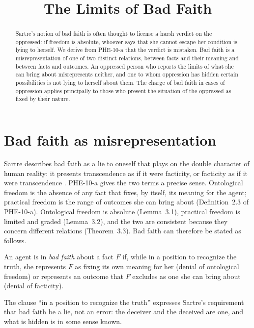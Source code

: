 \documentclass{situationist-preprint}
\title{The Limits of Bad Faith}
\begin{document}
\maketitle

\begin{abstract}
Sartre's notion of bad faith is often thought to license a harsh verdict on the oppressed: if freedom is absolute, whoever says that she cannot escape her condition is lying to herself. We derive from PHE-10-a that the verdict is mistaken. Bad faith is a misrepresentation of one of two distinct relations, between facts and their meaning and between facts and outcomes. An oppressed person who reports the limits of what she can bring about misrepresents neither, and one to whom oppression has hidden certain possibilities is not lying to herself about them. The charge of bad faith in cases of oppression applies principally to those who present the situation of the oppressed as fixed by their nature.
\end{abstract}

\section{Bad faith as misrepresentation}

Sartre describes bad faith as a lie to oneself that plays on the double character of human reality: it presents transcendence as if it were facticity, or facticity as if it were transcendence \citep[Part~I, ch.~2]{Sartre1943}. PHE-10-a gives the two terms a precise sense. Ontological freedom is the absence of any fact that fixes, by itself, its meaning for the agent; practical freedom is the range of outcomes she can bring about (Definition~2.3 of PHE-10-a). Ontological freedom is absolute (Lemma~3.1), practical freedom is limited and graded (Lemma~3.2), and the two are consistent because they concern different relations (Theorem~3.3). Bad faith can therefore be stated as follows.

\begin{definition}\label{d:bf}
An agent is in \emph{bad faith} about a fact $F$ if, while in a position to recognize the truth, she represents $F$ as fixing its own meaning for her (denial of ontological freedom) or represents an outcome that $F$ excludes as one she can bring about (denial of facticity).
\end{definition}

The clause \enquote{in a position to recognize the truth} expresses Sartre's requirement that bad faith be a lie, not an error: the deceiver and the deceived are one, and what is hidden is in some sense known.
\end{document}
